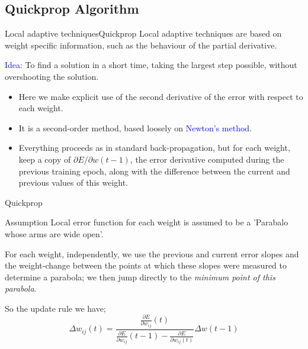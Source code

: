 \documentclass{beamer}
\begin{document}
\subsection{Quickprop Algorithm}
\begin{frame}{Local adaptive techniques}{Quickprop}
Local adaptive techniques are based on weight specific information, such as the behaviour of the partial derivative. 	
\vspace{3mm}

\textcolor{blue}{Idea}: To find a solution in a short time, taking the largest step possible, without overshooting the solution. 
	
	\pause
	
\begin{itemize}


\item Here we make explicit use of the second derivative of the error with respect to each weight. \\


\item It is a second-order method, based loosely on \textcolor{blue}{Newton’s method}. \\ 
\item Everything proceeds as in standard back-propagation, but for each weight, keep a copy of $ \partial E / \partial w(t-1) $, the error derivative computed during the previous training epoch, along with the difference between the current and previous values of this weight. 

\end{itemize}	

\end{frame}

\begin{frame}{Quickprop}
\begin{block}{Assumption}
Local error function for each weight is assumed to be a 'Parabalo whose arms are wide open'. \\
\end{block}

\pause
For each weight, independently, we use the previous and current error slopes and the weight-change between the points at which these slopes were measured to determine a parabola; we then jump directly to the \textit{minimum point of this parabola}.

\pause
\vspace{4mm}
So the update rule we have; 
\begin{equation}
\label{updaterule}
\Delta w_{ij} (t) = \frac{\frac{\partial E}{\partial w_{ij}} (t) }{\frac{\partial E}{\partial w_{ij}} (t-1) - \frac{\partial E}{\partial w_{ij} (t)}} \Delta w(t-1)
\end{equation}

\end{frame}
\end{document}
